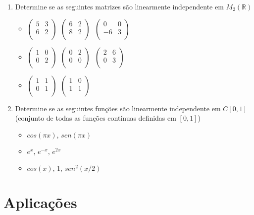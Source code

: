 \documentclass{article}
\theoremstyle{plain}
\theoremstyle{obs}
\numberwithin{equation}{section}
\begin{document}
\begin{enumerate}
     \item Determine se as seguintes matrizes são linearmente independente
     em $M_{2}(\mathbb{R})$
     
      \begin{itemize}
       \item
       $
       \begin{pmatrix}
       5 & 3 \\
       6 & 2 \\
       \end{pmatrix}
       \ \ 
       \begin{pmatrix}
       6 & 2 \\
       8 & 2 \\
       \end{pmatrix}
       \ \ \,
       \begin{pmatrix}
       0 & 0 \\
       -6 & 3 \\
       \end{pmatrix}
       $
       \item
       $
       \begin{pmatrix}
       1 & 0 \\
       0 & 2 \\
       \end{pmatrix}
       \ \ 
       \begin{pmatrix}
       0 & 2 \\
       0 & 0 \\
       \end{pmatrix}
       \ \ \,
       \begin{pmatrix}
       2 & 6 \\
       0 & 3 \\
       \end{pmatrix}
       $
       \item
       $
       \begin{pmatrix}
       1 & 1 \\
       0 & 1 \\
       \end{pmatrix}
       \ \ 
       \begin{pmatrix}
       1 & 0 \\
       1 & 1 \\
       \end{pmatrix}
       $
     \end{itemize} 
       
     \item Determine se as seguintes funções são linearmente independente
     em $C[0,1]$ (conjunto de todas as funções contínuas definidas em $[0,1]$)
       \begin{itemize}
       \item $cos(\pi x)$, $sen(\pi x)$
       \item $e^{x}$, $e^{-x}$, $e^{2x}$
       \item $cos(x)$, $1$, $sen^{2}(x/2)$
       \end{itemize}
     
    
\end{enumerate}


\section{Aplicações}
\end{document}
